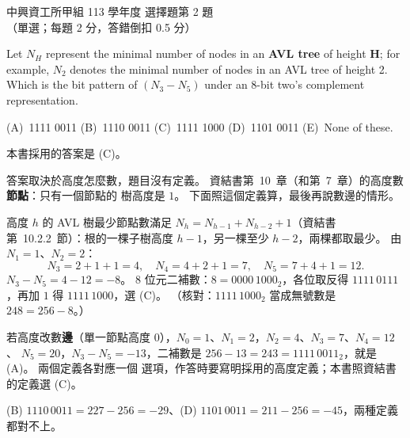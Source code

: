 \begin{pastexam}[label={px:nchu-113-dsa-02}]{中興資工所甲組 113 學年度 選擇題第 2 題}
（單選；每題 2 分，答錯倒扣 0.5 分）

Let $N_H$ represent the minimal number of nodes in an \textbf{AVL tree} of height $\boldsymbol{H}$; for
example, $N_2$ denotes the minimal number of nodes in an AVL tree of height 2. Which is the bit pattern of
$(N_3-N_5)$ under an 8-bit two's complement representation.

(A)~1111 0011 \qquad (B)~1110 0011 \qquad (C)~1111 1000 \qquad (D)~1101 0011 \qquad (E)~None of these.
\end{pastexam}

\begin{pastsoln}
本書採用的答案是 (C)。

答案取決於高度怎麼數，題目沒有定義。 資結書第~10~章（和第~7~章）的高度數\textbf{節點}：只有一個節點的
樹高度是 $1$。 下面照這個定義算，最後再說數邊的情形。

高度 $h$ 的 AVL 樹最少節點數滿足 $N_h = N_{h-1} + N_{h-2} + 1$（資結書第~10.2.2~節）：根的一棵子樹高度
$h - 1$，另一棵至少 $h - 2$，兩棵都取最少。 由 $N_1 = 1$、$N_2 = 2$：
\[
N_3 = 2 + 1 + 1 = 4,\quad N_4 = 4 + 2 + 1 = 7,\quad N_5 = 7 + 4 + 1 = 12.
\]
$N_3 - N_5 = 4 - 12 = -8$。 8 位元二補數：$8 = 0000\,1000_2$，各位取反得 $1111\,0111$，再加 $1$ 得
$1111\,1000$，選 (C)。 （核對：$1111\,1000_2$ 當成無號數是 $248 = 256 - 8$。）

若高度改數\textbf{邊}（單一節點高度 $0$），$N_0 = 1$、$N_1 = 2$，$N_2 = 4$、$N_3 = 7$、$N_4 = 12$、
$N_5 = 20$，$N_3 - N_5 = -13$，二補數是 $256 - 13 = 243 = 1111\,0011_2$，就是 (A)。 兩個定義各對應一個
選項，作答時要寫明採用的高度定義；本書照資結書的定義選 (C)。

(B) $1110\,0011 = 227 - 256 = -29$、(D) $1101\,0011 = 211 - 256 = -45$，兩種定義都對不上。
\end{pastsoln}
